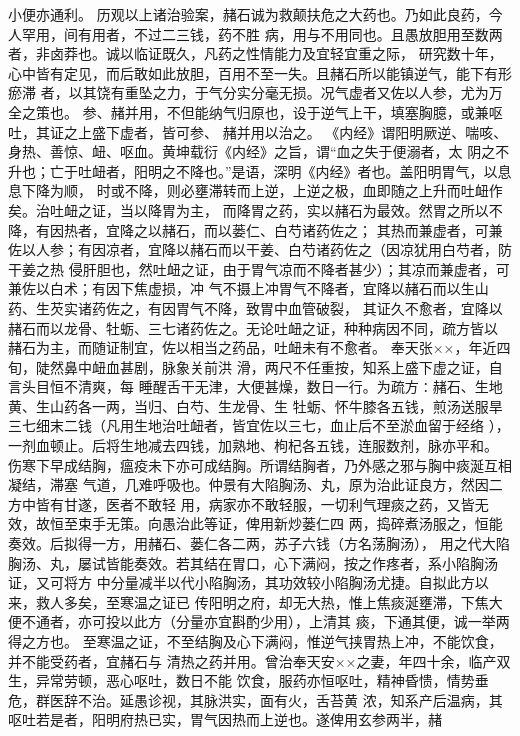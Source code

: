 \documentclass[a4paper,12pt,UTF8,twoside]{ctexbook}
\begin{document}
小便亦通利。 
历观以上诸治验案，赭石诚为救颠扶危之大药也。乃如此良药，今人罕用，间有用者，不过二三钱，药不胜 
病，用与不用同也。且愚放胆用至数两者，非卤莽也。诚以临证既久，凡药之性情能力及宜轻宜重之际， 
研究数十年，心中皆有定见，而后敢如此放胆，百用不至一失。且赭石所以能镇逆气，能下有形瘀滞 
者，以其饶有重坠之力，于气分实分毫无损。况气虚者又佐以人参，尤为万全之策也。 
参、赭并用，不但能纳气归原也，设于逆气上干，填塞胸臆，或兼呕吐，其证之上盛下虚者，皆可参、 
赭并用以治之。 
《内经》谓阳明厥逆、喘咳、身热、善惊、衄、呕血。黄坤载衍《内经》之旨，谓“血之失于便溺者，太 
阴之不升也；亡于吐衄者，阳明之不降也。”是语，深明《内经》者也。盖阳明胃气，以息息下降为顺， 
时或不降，则必壅滞转而上逆，上逆之极，血即随之上升而吐衄作矣。治吐衄之证，当以降胃为主， 
而降胃之药，实以赭石为最效。然胃之所以不降，有因热者，宜降之以赭石，而以蒌仁、白芍诸药佐之； 
其热而兼虚者，可兼佐以人参；有因凉者，宜降以赭石而以干姜、白芍诸药佐之（因凉犹用白芍者，防干姜之热 
侵肝胆也，然吐衄之证，由于胃气凉而不降者甚少）；其凉而兼虚者，可兼佐以白术；有因下焦虚损，冲 
气不摄上冲胃气不降者，宜降以赭石而以生山药、生芡实诸药佐之，有因胃气不降，致胃中血管破裂， 
其证久不愈者，宜降以赭石而以龙骨、牡蛎、三七诸药佐之。无论吐衄之证，种种病因不同，疏方皆以 
赭石为主，而随证制宜，佐以相当之药品，吐衄未有不愈者。 
奉天张××，年近四旬，陡然鼻中衄血甚剧，脉象关前洪 
滑，两尺不任重按，知系上盛下虚之证，自言头目恒不清爽，每 
睡醒舌干无津，大便甚燥，数日一行。为疏方∶赭石、生地黄、生山药各一两，当归、白芍、生龙骨、生 
牡蛎、怀牛膝各五钱，煎汤送服旱三七细末二钱（凡用生地治吐衄者，皆宜佐以三七，血止后不至淤血留于经络 
），一剂血顿止。后将生地减去四钱，加熟地、枸杞各五钱，连服数剂，脉亦平和。 
伤寒下早成结胸，瘟疫未下亦可成结胸。所谓结胸者，乃外感之邪与胸中痰涎互相凝结，滞塞 
气道，几难呼吸也。仲景有大陷胸汤、丸，原为治此证良方，然因二方中皆有甘遂，医者不敢轻 
用，病家亦不敢轻服，一切利气理痰之药，又皆无效，故恒至束手无策。向愚治此等证，俾用新炒蒌仁四 
两，捣碎煮汤服之，恒能奏效。后拟得一方，用赭石、蒌仁各二两，苏子六钱（方名荡胸汤）， 
用之代大陷胸汤、丸，屡试皆能奏效。若其结在胃口，心下满闷，按之作疼者，系小陷胸汤证，又可将方 
中分量减半以代小陷胸汤，其功效较小陷胸汤尤捷。自拟此方以来，救人多矣，至寒温之证已 
传阳明之府，却无大热，惟上焦痰涎壅滞，下焦大便不通者，亦可投以此方（分量亦宜斟酌少用），上清其 
痰，下通其便，诚一举两得之方也。 
至寒温之证，不至结胸及心下满闷，惟逆气挟胃热上冲，不能饮食，并不能受药者，宜赭石与 
清热之药并用。曾治奉天安××之妻，年四十余，临产双生，异常劳顿，恶心呕吐，数日不能 
饮食，服药亦恒呕吐，精神昏愦，情势垂危，群医辞不治。延愚诊视，其脉洪实，面有火，舌苔黄 
浓，知系产后温病，其呕吐若是者，阳明府热已实，胃气因热而上逆也。遂俾用玄参两半，赭 
\end{document}
